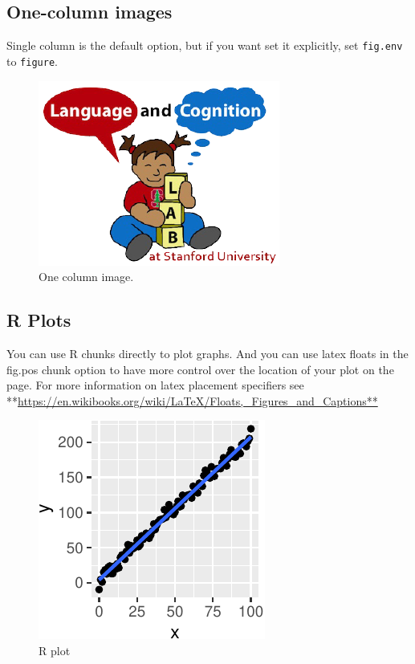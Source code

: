 \documentclass[11pt]{article}
\newenvironment{CodeChunk}{}{}
\begin{document}
\subsection{One-column images}\label{one-column-images}

Single column is the default option, but if you want set it explicitly,
set \texttt{fig.env} to \texttt{figure}.

\begin{CodeChunk}
\begin{figure}[H]

{\centering \includegraphics{figs/image-1} 

}

\caption[One column image]{One column image.}\label{fig:image}
\end{figure}
\end{CodeChunk}

\subsection{R Plots}\label{r-plots}

You can use R chunks directly to plot graphs. And you can use latex
floats in the fig.pos chunk option to have more control over the
location of your plot on the page. For more information on latex
placement specifiers see
**\url{https://en.wikibooks.org/wiki/LaTeX/Floats,_Figures_and_Captions**}

\begin{CodeChunk}
\begin{figure}[H]

{\centering \includegraphics{figs/plot-1} 

}

\caption[R plot]{R plot}\label{fig:plot}
\end{figure}
\end{CodeChunk}
\end{document}
